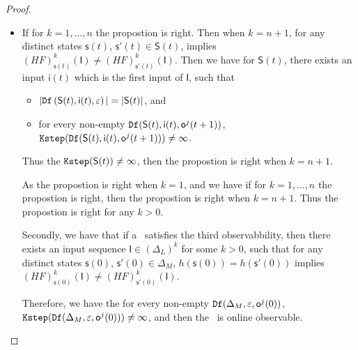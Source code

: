 \begin{appendices}
\begin{proof}
\begin{itemize}
\item If for $k=1,\ldots, n$ the propostion is right. Then when $k=n+1$, for any distinct states $\mathsf{s}(t)$, $\mathsf{s}'(t) \in \mathsf{S}(t)$, implies $(HF)^{k}_{\mathsf{s}(t)}(\mathsf{I})\neq (HF)^{k}_{\mathsf{s}'(t)}(\mathsf{I})$. Then we have for $\mathsf{S}(t)$,
 there exists an input $\mathsf{i}(t)$ which is the first input of $\mathsf{I}$, such that
 \begin{itemize}
\item  $|{\tt Df}\left(\mathsf{S}(t),\mathsf{i}(t),\varepsilon\right)|=|\mathsf{S}(t)|$, and 
 \item  for every non-empty ${\tt Df}(\mathsf{S}(t),\mathsf{i}(t),\mathsf{o}^{j}(t+1))$, ${\tt Kstep}({\tt Df}(\mathsf{S}(t),\mathsf{i}(t),\mathsf{o}^{j}(t+1)))\ne \infty$.
 \end{itemize}
Thus the ${\tt Kstep}(\mathsf{S}(t))\ne \infty$, then the propostion is right when $k =n+1$.

As the propostion is right when $k =1$, and we have if for $k=1,\ldots, n$ the propostion is right, then the propostion is right when $k=n+1$. Thus the propostion is right for any $k>0$.

Secondly, we have that if a \BCN\ satisfies the third observabbility, then there exists an input sequence $\mathsf{I}\in(\Delta_L)^{k}$ for some $k >0$, such that for any distinct states $\mathsf{s}(0)$, $\mathsf{s}'(0) \in \Delta_M$, $h(\mathsf{s}(0))=h(\mathsf{s}'(0))$ implies $(HF)^{k}_{\mathsf{s}(0)}(\mathsf{I})\neq (HF)^{k}_{\mathsf{s}'(0)}(\mathsf{I})$. 

Therefore, we have the for every non-empty ${\tt Df}(\Delta_M,\varepsilon, \mathsf{o}^{j}(0))$, ${\tt Kstep}({\tt Df}(\Delta_M,\varepsilon,\mathsf{o}^{j}(0)))\ne \infty$, and then the \BCN\ is online observable.
 \end{itemize}
\end{proof}

\end{appendices}
